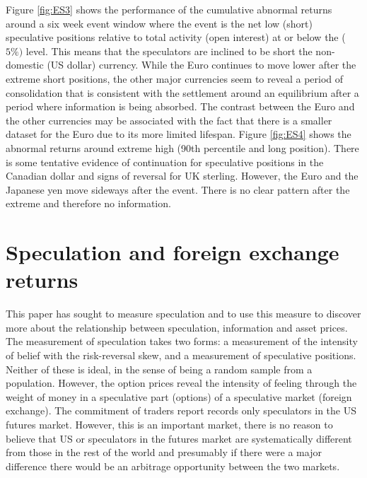 \documentclass[12pt, a4paper, oneside]{article} %
\begin{document}
Figure \ref{fig:ES3} shows the performance of the cumulative abnormal returns around a six week event window where the event is the net low (short) speculative positions relative to total activity (open interest) at or below the ($5\%)$ level.  This means that the speculators are inclined to be short the non-domestic (US dollar) currency.  While the Euro continues to move lower after the extreme short positions, the other major currencies seem to reveal a period of consolidation that is consistent with the settlement around an equilibrium after a period where information is being absorbed.  The contrast between the Euro and the other currencies may be associated with the fact that there is a smaller dataset for the Euro due to its more limited lifespan.  Figure \ref{fig:ES4} shows the abnormal returns around extreme high (90th percentile and long position).  There is some tentative evidence of continuation for speculative positions in the Canadian dollar and signs of reversal for UK sterling.  However, the Euro and the Japanese yen move sideways after the event.  There is no clear pattern after the extreme and therefore no information.  

\section{Speculation and foreign exchange returns}
This paper has sought to measure speculation and to use this measure to discover more about the relationship between speculation, information and asset prices.  The measurement of speculation takes two forms:  a measurement of the intensity of belief with the risk-reversal skew, and a measurement of speculative positions.  Neither of these is ideal, in the sense of being a random sample from a population.  However, the option prices reveal the intensity of feeling through the weight of money in a speculative part (options) of a speculative market (foreign exchange).  The commitment of traders report records only speculators in the US futures market.  However, this is an important market, there is no reason to believe that US or speculators in the futures market are systematically different from those in the rest of the world and presumably if there were a major difference there would be an arbitrage opportunity between the two markets.  
\end{document}
